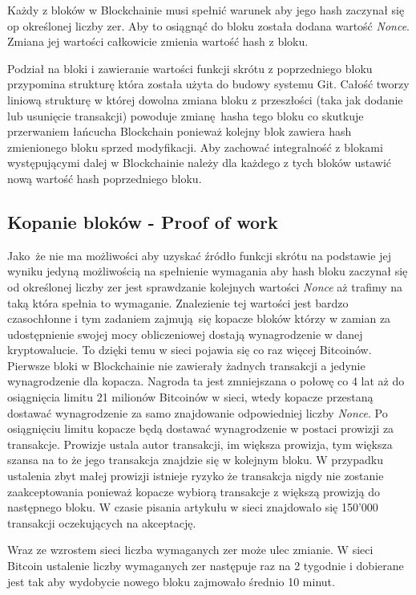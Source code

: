 \documentclass[journal,12pt,onecolumn,draftclsnofoot,]{IEEEtran}
\begin{document}
Każdy z bloków w Blockchainie musi spełnić warunek aby jego hash zaczynał się op określonej liczby zer. Aby to osiągnąć
do bloku została dodana wartość \textit{Nonce}. Zmiana jej wartości całkowicie zmienia wartość hash z bloku.

Podział na bloki i zawieranie wartości funkcji skrótu z poprzedniego bloku przypomina strukturę która została użyta do
budowy systemu Git\cite{git}. Całość tworzy liniową strukturę w której dowolna zmiana bloku z przeszłości (taka jak
dodanie lub usunięcie transakcji) powoduje zmianę hasha tego bloku co skutkuje przerwaniem łańcucha Blockchain ponieważ
kolejny blok zawiera hash zmienionego bloku sprzed modyfikacji. Aby zachować integralność z blokami występującymi dalej
w Blockchainie należy dla każdego z tych bloków ustawić nową wartość hash poprzedniego bloku.

\subsection{Kopanie bloków - Proof of work}

Jako że nie ma możliwości aby uzyskać źródło funkcji skrótu na podstawie jej wyniku jedyną możliwością na spełnienie
wymagania aby hash bloku zaczynał się od określonej liczby zer jest sprawdzanie kolejnych wartości \textit{Nonce} aż
trafimy na taką która spełnia to wymaganie. Znalezienie tej wartości jest bardzo czasochłonne i tym zadaniem zajmują się
kopacze bloków którzy w zamian za udostępnienie swojej mocy obliczeniowej dostają wynagrodzenie w danej kryptowalucie.
To dzięki temu w sieci pojawia się co raz więcej Bitcoinów. Pierwsze bloki w Blockchainie nie zawierały żadnych
transakcji a jedynie wynagrodzenie dla kopacza. Nagroda ta jest zmniejszana o połowę co 4 lat aż do osiągnięcia limitu
21 milionów Bitcoinów w sieci, wtedy kopacze przestaną dostawać wynagrodzenie za samo znajdowanie odpowiedniej liczby
\textit{Nonce}. Po osiągnięciu limitu kopacze będą dostawać wynagrodzenie w postaci prowizji za transakcje.  Prowizje
ustala autor transakcji, im większa prowizja, tym większa szansa na to że jego transakcja znajdzie się w kolejnym bloku.
W przypadku ustalenia zbyt małej prowizji istnieje ryzyko że transakcja nigdy nie zostanie zaakceptowania ponieważ
kopacze wybiorą transakcje z większą prowizją do następnego bloku. W czasie pisania artykułu w sieci znajdowało się
150'000 transakcji oczekujących na akceptację\cite{niezatwierdzoneTransakcje}.

Wraz ze wzrostem sieci liczba wymaganych zer może ulec zmianie. W sieci Bitcoin ustalenie liczby wymaganych zer
następuje raz na 2 tygodnie i dobierane jest tak aby wydobycie nowego bloku zajmowało średnio 10 minut.
\end{document}
